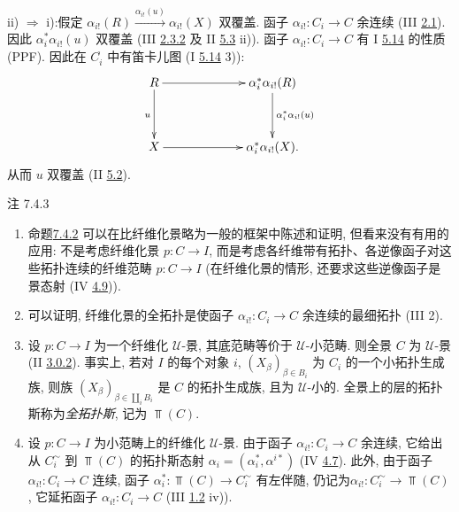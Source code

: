 ii) $\Rightarrow$ i):\pageoriginale 假定
$\alpha_{i!}(R)\xrightarrow{\alpha_{i!}(u)}\alpha_{i!}(X)$ 双覆盖.
函子 $\alpha_{i!}:C_i\to C$ 余连续 (III \hyperref[III.def2.1]{2.1}).
因此 $\alpha^{\ast}_{i}\alpha_{i!}(u)$ 双覆盖
(III \hyperref[III.eq2.3.2]{2.3.2} 及 II \hyperref[II.prop5.3]{5.3} ii)).
函子 $\alpha_{i!}:C_i\to C$ 有 I \hyperref[I.prop5.14]{5.14} 的性质 (PPF).
因此在 $C^{\widehat{\phantom{,}}}_i$ 中有笛卡儿图
(I \hyperref[I.prop5.14]{5.14} 3)):
\[
\xymatrix@C=2.25cm@R=1.25cm{
R  \ar[r] \ar[d]_{u}& \alpha_i^{\ast}\alpha_{i!}(R) \ar[d]^{\alpha_i^{\ast}\alpha_{i!}(u)}\\
X     \ar[r]          & \alpha_i^{\ast}\alpha_{i!}(X).
}
\]
从而 $u$ 双覆盖 (II \hyperref[II.def5.2]{5.2}).

\begin{enonce*}[remark]{注 7.4.3}
\begin{enumerate}
\renewcommand{\labelenumi}{\theenumi)}
\item 命题\hyperref[VI.prop7.4.2]{7.4.2}
可以在比纤维化景略为一般的框架中陈述和证明, 但看来没有有用的应用:
不是考虑纤维化景 $p:C\to I$,
而是考虑各纤维带有拓扑、各逆像函子对这些拓扑连续的纤维范畴 $p:C\to I$
(在纤维化景的情形, 还要求这些逆像函子是景态射
(IV \hyperref[IV.subsec4.9]{4.9})).

\item 可以证明, 纤维化景的全拓扑是使函子 $\alpha_{i!}:C_i\to C$ 余连续的最细拓扑
(III 2).

\hypertarget{sga4.exp.VI.remark.7.4.3.item.3}{}\item 设 $p:C\to I$ 为一个纤维化 $𝒰$-景,
其底范畴等价于 $𝒰$-小范畴.
则全景 $C$ 为 $𝒰$-景 (II \hyperref[II.def3.0.2]{3.0.2}).
事实上, 若对 $I$ 的每个对象 $i$,
$(X_{\beta})_{\beta\in B_i}$ 为 $C_i$ 的一个小拓扑生成族,
则族 $(X_{\beta})_{\beta\in\amalg_iB_i}$ 是 $C$ 的拓扑生成族, 且为 $𝒰$-小的.
全景上的层的拓扑斯称为\emph{全拓扑斯}, 记为 $\Top(C)$.

\hypertarget{sga4.exp.VI.remark.7.4.3.item.4}{}\item 设 $p:C\to I$ 为小范畴上的纤维化 $𝒰$-景.
由于函子 $\alpha_{i!}:C_i\to C$ 余连续,
它给出从 $C^{\sim}_i$ 到 $\Top(C)$ 的拓扑斯态射
$\alpha_i=(\alpha^{\ast}_i,\alpha^{i\ast})$ (IV \hyperref[IV.subsec4.7]{4.7}).
此外, 由于函子 $\alpha_{i!}:C_i\to C$ 连续,
函子 $\alpha^{\ast}_i:\Top(C)\to C^{\sim}_i$ 有左伴随,
仍记为\pageoriginale $\alpha_{i!}:C^{\sim}_i\to\Top(C)$,
它延拓函子 $\alpha_{i!}:C_i\to C$ (III \hyperref[III.prop1.2]{1.2} iv)).
\end{enumerate}
\end{enonce*}


